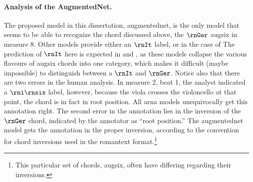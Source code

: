 \paragraph{Analysis of the AugmentedNet.}

The proposed model in this dissertation, \gls{augmentednet},
is the only model that seems to be able to recognize the
chord discussed above, the $\rnGer$ \gls{augsix} in measure
8. Other models provide either an $\rnIt$ label, or in the
case of The prediction of $\rnIt$ here is expected in
\textcite{chen2021attend} and \textcite{micchi2021deep}, as
these models collapse the various flavours of \gls{augsix}
chords into one category, which makes it difficult (maybe
impossible) to distinguish between a $\rnIt$ and $\rnGer$.
Notice also that there are two errors in the human analysis.
In measure 2, beat 1, the analyst indicated a $\rni\rnsix$
label, however, because the viola crosses the violoncello at
that point, the chord is in fact in root position. All
\gls{arna} models unequivocally get this annotation right.
The second error in the annotation lies in the inversion of
the $\rnGer$ chord, indicated by the annotator as ``root
position.'' The \gls{augmentednet} model gets the annotation
in the proper inversion, according to the convention for
chord inversions used in the \gls{romantext}
format.\footnote{This particular set of chords,
\gls{augsix}, often have differing regarding their
inversions.}

